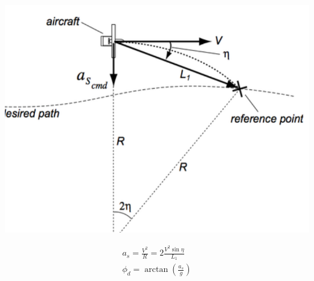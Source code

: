 \documentclass[landscape,a0paper,fontscale=0.285]{baposter} %
\newcommand{\atan}{\arctan}
\begin{document}
\begin{poster}
{\begin{minipage}[c]{0.575\textwidth}
\centering
\includegraphics[width=\textwidth]{images/L1_guidance.png}
\end{minipage}
\hfill
\begin{minipage}[c]{0.4\textwidth}
    \[
\begin{array}{l}
a_s = \frac{V^2}{R} = 2\frac{V^2 \sin\eta}{L_1} \\
\phi_d = \atan\left(\frac{a_s}{g}\right)
\end{array}
\]
\end{minipage}


\colorbox[HTML]{CCFFFF}{}

}
\end{poster}
\end{document}
